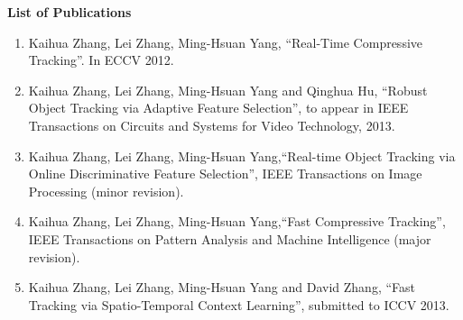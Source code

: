 \documentclass[12pt,oneside]{report}
\numberwithin{figure}{chapter}
\newenvironment{preliminary}%
{\pagestyle{plain}\pagenumbering{roman}}%
{\pagenumbering{arabic}}
\begin{document}
\begin{preliminary}
\newpage
{}
\Large\begin{center}\textbf{List of Publications}\end{center}\normalsize
\begin{enumerate}
  \item Kaihua Zhang, Lei Zhang, Ming-Hsuan Yang, ``Real-Time Compressive Tracking''. In ECCV 2012.
  \item Kaihua Zhang, Lei Zhang, Ming-Hsuan Yang and Qinghua Hu, ``Robust Object Tracking via Adaptive Feature Selection'', to appear in IEEE Transactions on Circuits and Systems for Video Technology, 2013.
 \item Kaihua Zhang, Lei Zhang, Ming-Hsuan Yang,``Real-time Object Tracking via Online Discriminative Feature Selection'', IEEE Transactions on Image Processing (minor revision).
  \item Kaihua Zhang, Lei Zhang, Ming-Hsuan Yang,``Fast Compressive Tracking'', IEEE Transactions on Pattern Analysis and Machine Intelligence (major revision).
  \item Kaihua Zhang, Lei Zhang, Ming-Hsuan Yang and David Zhang, ``Fast Tracking via Spatio-Temporal Context Learning'', submitted to ICCV 2013.




\end{enumerate}

\newpage

\tableofcontents\newpage
\newpage
{}
\listoffigures
\newpage
{}
\listoftables
\cleardoublepage  %


\end{preliminary}



\makeatletter
\long{}
\makeatother
\end{document}
